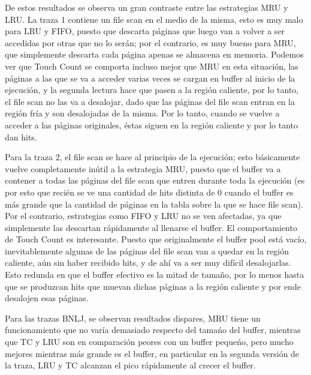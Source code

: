 De estos resultados se observa un gran contraste entre las estrategias MRU y LRU. La traza 1 contiene un file scan en el medio de la misma, esto es muy malo para LRU y FIFO, puesto que descarta p\'aginas que luego van a volver a ser accedidas por otras que no lo ser\'an; por el contrario, es muy bueno para MRU, que simplemente descarta cada p\'agina apenas se almacena en memoria. Podemos ver que Touch Count se comporta incluso mejor que MRU en esta situaci\'on, las p\'aginas a las que se va a acceder varias veces se cargan en buffer al inicio de la ejecuci\'on, y la segunda lectura hace que pasen a la regi\'on caliente, por lo tanto, el file scan no las va a desalojar, dado que las p\'aginas del file scan entran en la regi\'on fr\'ia y son desalojadas de la misma. Por lo tanto, cuando se vuelve a acceder a las p\'aginas originales, \'estas siguen en la regi\'on caliente y por lo tanto dan hits.

Para la traza 2, el file scan se hace al principio de la ejecuci\'on; esto b\'asicamente vuelve completamente in\'util a la estrategia MRU, puesto que el buffer va a contener a todas las p\'aginas del file scan que entren durante toda la ejecuci\'on (es por esto que reci\'en se ve una cantidad de hits distinta de 0 cuando el buffer es m\'as grande que la cantidad de p\'aginas en la tabla sobre la que se hace file scan). Por el contrario, estrategias como FIFO y LRU no se ven afectadas, ya que simplemente las descartan r\'apidamente al llenarse el buffer. El comportamiento de Touch Count es interesante. Puesto que originalmente el buffer pool est\'a vac\'io, inevitablemente algunas de las p\'aginas del file scan van a quedar en la regi\'on caliente, a\'un sin haber recibido hits, y de ah\'i va a ser muy dif\'icil desalojarlas. Esto redunda en que el buffer efectivo es la mitad de tama\~no, por lo menos hasta que se produzcan hits que muevan dichas p\'aginas a la regi\'on caliente y por ende desalojen esas p\'aginas.

Para las trazas BNLJ, se observan resultados dispares, MRU tiene un funcionamiento que no var\'ia demasiado respecto del tama\'no del buffer, mientras que TC y LRU son en comparaci\'on peores con un buffer peque\'no, pero mucho mejores mientras m\'as grande es el buffer, en particular en la segunda versi\'on de la traza, LRU y TC alcanzan el pico r\'apidamente al crecer el buffer.


